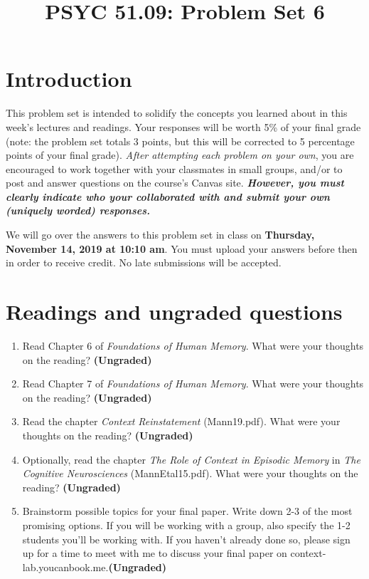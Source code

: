 \documentclass[11pt]{article}
\title{PSYC 51.09: Problem Set 6}
\date{}
\begin{document}
\maketitle
\vspace{-0.75in}
\section*{Introduction}
This problem set is intended to solidify the concepts you learned
about in this week's lectures and readings.  Your responses will be
worth 5\% of your final grade (note: the problem set totals 3 points,
but this will be corrected to 5 percentage points of your final
grade).  \textit{After attempting each problem on your own}, you are
encouraged to work together with your classmates in small groups,
and/or to post and answer questions on the course’s Canvas site.
\textbf{\textit{However, you must clearly indicate who your
    collaborated with and submit your own (uniquely worded)
    responses.}}

We will go over the answers to this problem set in class on
\textbf{Thursday, November 14, 2019 at 10:10 am}.  You must upload your answers before then in order to receive credit.  No late submissions will be accepted.

\section*{Readings and ungraded questions}
\begin{enumerate}
\item Read Chapter 6 of \textit{Foundations of Human Memory}.  What were your thoughts on the reading?
  \textbf{(Ungraded)}

\item Read Chapter 7 of \textit{Foundations of Human Memory}.  What were your thoughts on the reading?
  \textbf{(Ungraded)}

\item Read the chapter \textit{Context Reinstatement} (Mann19.pdf).  What were your thoughts on the reading?
  \textbf{(Ungraded)}

\item Optionally, read the chapter \textit{The Role of Context in
    Episodic Memory} in \textit{The Cognitive Neurosciences}
  (MannEtal15.pdf).  What were your thoughts on the reading?
  \textbf{(Ungraded)}


\item Brainstorm possible topics for your final paper.  Write down 2-3
  of the most promising options.  If you will be working with a group,
  also specify the 1-2 students you'll be working with. If you haven't
  already done so, please sign up for a time to meet with me to
  discuss your final paper on context-lab.youcanbook.me.\textbf{(Ungraded)}
\end{enumerate}
\end{document}

